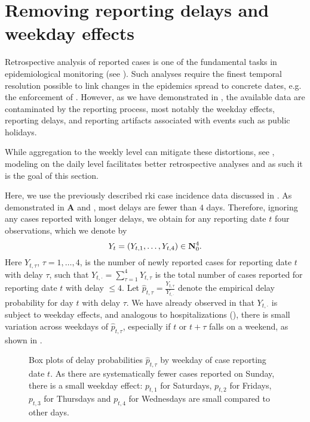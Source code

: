 \section{Removing reporting delays and weekday effects}%
\label{sec:model_reporting_delay}

Retrospective analysis of reported cases is one of the fundamental tasks in epidemiological monitoring (see ). Such analyses require the finest temporal resolution possible to link changes in the epidemics spread to concrete dates, e.g. the enforcement of . However, as we have demonstrated in , the available data are contaminated by the reporting process, most notably the weekday effects, reporting delays, and reporting artifacts associated with events such as public holidays.

While aggregation to the weekly level can mitigate these distortions, see , modeling on the daily level facilitates better retrospective analyses and as such it is the goal of this section.

Here, we use the previously described \acrshort{rki} case incidence data discussed in . As demonstrated in  \textbf{A} and , most delays are fewer than $4$ days. Therefore, ignoring any cases reported with longer delays, we obtain for any reporting date $t$ four observations, which we denote by 
$$
    Y_{t} = \left( Y_{t, 1}, \dots, Y_{t, 4} \right) \in \mathbf N^{4}_{0}.
$$
Here $Y_{t,\tau}$, $\tau = 1, \dots, 4$, is the number of newly reported cases for reporting date $t$ with delay $\tau$, such that $Y_{t,\cdot} = \sum_{\tau = 1}^4 Y_{t, \tau}$ is the total number of cases reported for reporting date $t$ with delay $\leq 4$. 
Let $\hat p_{t, \tau} = \frac{Y_{t,\tau}}{Y_{t,\cdot}}$ denote the empirical delay probability for day $t$ with delay $\tau$. We have already observed in  that $Y_{t, \cdot}$ is subject to weekday effects, and analogous to hospitalizations (), there is small variation across weekdays of $\hat p_{t,\tau}$, especially if $t$ or $t+\tau$ falls on a weekend, as shown in . 

\begin{figure}
    \resizebox{\textwidth}{!}{%
    }
    \caption{Box plots of delay probabilities $\hat p_{t,\tau}$ by weekday of case reporting date $t$. As there are systematically fewer cases reported on Sunday, there is a small weekday effect: $p_{t,1}$ for Saturdays, $p_{t,2}$ for Fridays, $p_{t,3}$ for Thursdays and $p_{t,4}$ for Wednesdays are small compared to other days.}
    \label{fig:weekday_effect_delays}
\end{figure}

